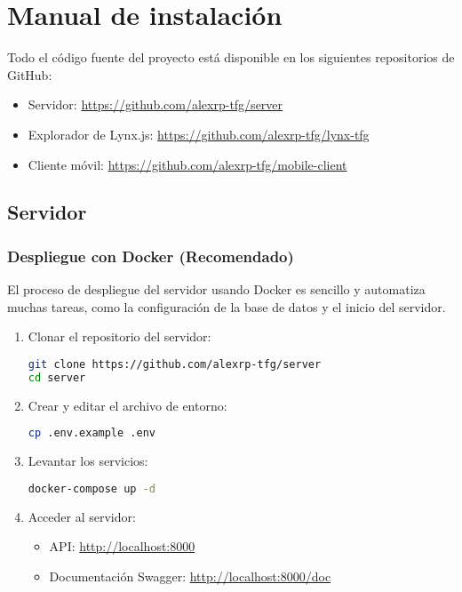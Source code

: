 \chapter{Manual de instalación}
\label{chap:manual_instalacion}
Todo el código fuente del proyecto está disponible en los siguientes repositorios de GitHub:
\begin{itemize}
    \item Servidor: \url{https://github.com/alexrp-tfg/server}
    \item Explorador de Lynx.js: \url{https://github.com/alexrp-tfg/lynx-tfg}
    \item Cliente móvil: \url{https://github.com/alexrp-tfg/mobile-client}
\end{itemize}
\section{Servidor}
\subsection{Despliegue con Docker (Recomendado)}
El proceso de despliegue del servidor usando Docker es sencillo y automatiza muchas tareas, como la configuración de la base de datos y el inicio del servidor.
\begin{enumerate}
    \item Clonar el repositorio del servidor:
\begin{lstlisting}[language=bash]
git clone https://github.com/alexrp-tfg/server
cd server
\end{lstlisting}

    \item Crear y editar el archivo de entorno:
\begin{lstlisting}[language=bash]
cp .env.example .env
\end{lstlisting}

    \item Levantar los servicios:
\begin{lstlisting}[language=bash]
docker-compose up -d
\end{lstlisting}

    \item Acceder al servidor:
        \begin{itemize}
            \item API: \url{http://localhost:8000}
            \item Documentación Swagger: \url{http://localhost:8000/doc}
        \end{itemize}
\end{enumerate}


